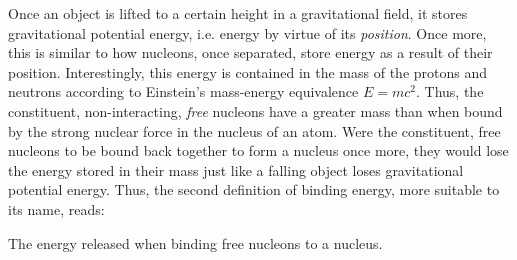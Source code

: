 Once an object is lifted to a certain height in a gravitational field, it stores gravitational potential energy, i.e. energy by virtue of its \emph{position}. Once more, this is similar to how nucleons, once separated, store energy as a result of their position. Interestingly, this energy is contained in the mass of the protons and neutrons according to Einstein's mass-energy equivalence $E=mc^2$. Thus, the constituent, non-interacting, \emph{free} nucleons have a greater mass than when bound by the strong nuclear force in the nucleus of an atom. Were the constituent, free nucleons to be bound back together to form a nucleus once more, they would lose the energy stored in their mass just like a falling object loses gravitational potential energy. Thus, the second definition of binding energy, more suitable to its name, reads:

\begin{displayquote}
	
	The energy released when binding free nucleons to a nucleus.

\end{displayquote}

